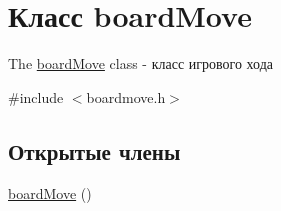 \hypertarget{classboard_move}{}\section{Класс board\+Move}
\label{classboard_move}


The \hyperlink{classboard_move}{board\+Move} class -\/ класс игрового хода  




{\ttfamily \#include $<$boardmove.\+h$>$}

\subsection*{Открытые члены}
\begin{DoxyCompactItemize}
\item 
\hypertarget{classboard_move_a2e7ec427f296755d8a2ff553802aa381}{}\hyperlink{classboard_move_a2e7ec427f296755d8a2ff553802aa381}{board\+Move} ()\label{classboard_move_a2e7ec427f296755d8a2ff553802aa381}


\end{DoxyCompactItemize}
